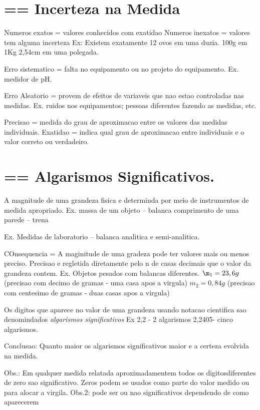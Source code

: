 \documentclass[a4paper,12pt]{article}
\begin{document}
\section{== Incerteza na Medida}

Numeros exatos = valores conhecidos com exatidao
Numeros inexatos = valores tem alguma incerteza
Ex:
  Existem exatamente 12 ovos em uma duzia.
  100g em 1Kg
  2,54cm em uma polegada.

Erro sistematico = falta no equipamento ou no projeto do equipamento.
  Ex. medidor de pH.

Erro Aleatorio = provem de efeitos de variaveis que nao estao controladas nas medidas. Ex. ruidos nos equipamentos; pessoas diferentes fazendo as medidas, etc.

Precisao = medida do grau de aproximacao entre os valores das medidas individuais.
Exatidao = indica qual grau de aproximacao entre individuais e o valor correto ou verdadeiro.

\section{== Algarismos Significativos.}

A magnitude de uma grandeza fisica e determinda por meio de instrumentos de medida apropriado.
Ex.
  massa de um objeto -- balanca
  comprimento de uma parede -- trena

Ex. Medidas de laboratorio -- balanca analitica e semi-analitica.

COnsequencia = A maginitude de uma gradeza pode ter valores mais ou menos preciso.
Precisao e regletida diretamente pelo n de casas decimais que o valor da grandeza contem.
Ex.
  Objetos pesados com balancas diferentes.
$\m_1 = 23,6g$ (precisao com decimo de gramas - uma casa apos a virgula)
$m_2 = 0,84g$ (precisao com centesimo de gramas - duas casas apos a virgula)

Os digitos que aparece no valor de uma grandeza usando notacao cientifica sao denomindados \textit{algarismos significativos}
Ex
  2,2 - 2 algarismos
  2,2405- cinco algarismos.

Conclusao: Quanto maior os algarismos significativos maior e a certeza evolvida na medida.


Obs.: Em qualquer medida relatada aproximadamentem todos os digitosdiferentes de zero sao significativo.
  Zeros podem se usados como parte do valor medido ou para alocar a virgila.
Obs.2: pode ser ou nao significativos dependendo de como aparecerem
\end{document}
